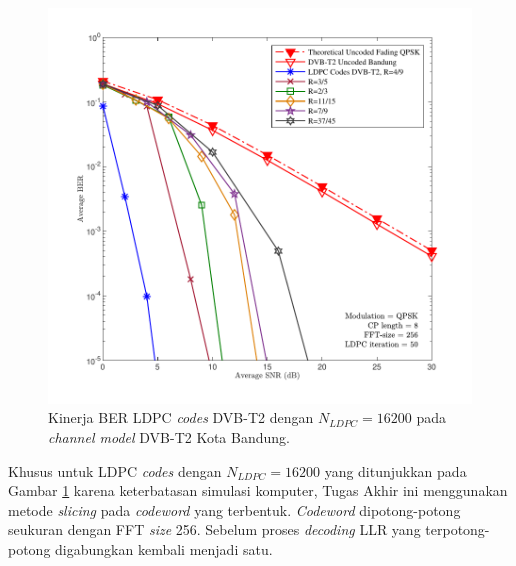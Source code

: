  \begin{figure}[tb!]
	\centering
	\includegraphics[width=1\textwidth]
	{hasilOFDMaslifix2.pdf}
	\caption{Kinerja BER LDPC \textit{codes} DVB-T2 dengan $N_{LDPC}=16200$ pada \textit{channel model} DVB-T2 Kota Bandung.}
	\label{fig:ofdmori}
\end{figure}

Khusus untuk LDPC \textit{codes} dengan $N_{LDPC}=16200$ yang ditunjukkan pada Gambar \ref{fig:ofdmori} karena keterbatasan simulasi komputer, Tugas Akhir ini menggunakan metode \textit{slicing} pada \textit{codeword} yang terbentuk. \textit{Codeword} dipotong-potong seukuran dengan FFT \textit{size} 256. Sebelum proses \textit{decoding} LLR yang terpotong-potong digabungkan kembali menjadi satu.

